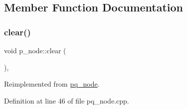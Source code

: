 \subsection{Member Function Documentation}
\mbox{\label{classp__node_af24fe11743b0836b03c108a1bf8a0995}} 
\subsubsection{\texorpdfstring{clear()}{clear()}}
{\footnotesize\ttfamily void p\+\_\+node\+::clear (\begin{DoxyParamCaption}{ }\end{DoxyParamCaption})\hspace{0.3cm}{\ttfamily [private]}, {\ttfamily [virtual]}}



Reimplemented from \mbox{\hyperlink{classpq__node_a13100e0b030cc047f382d9ddf6a44f4a}{pq\+\_\+node}}.



Definition at line 46 of file pq\+\_\+node.\+cpp.



